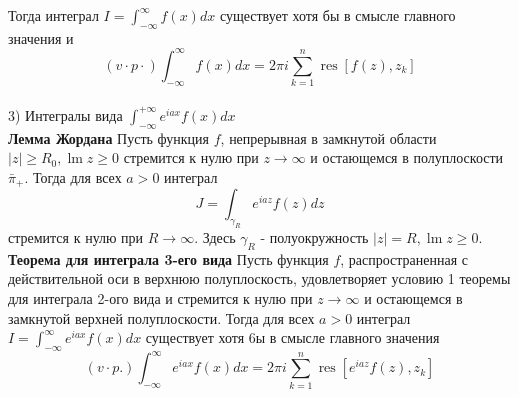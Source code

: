 \documentclass{article}
\begin{document}
	Тогда интеграл $ I=\int_{-\infty}^{\infty} f(x) d x $ существует хотя бы в смысле главного значения и
	\begin{equation}
	(v \cdot p \cdot) \int_{-\infty}^{\infty} f(x) d x=2 \pi i \sum_{k=1}^{n} \operatorname{res}\left[f(z), z_{k}\right]
	\end{equation}
	\\
	3) Интегралы вида $\int_{-\infty}^{+\infty} {e}^{iax}f(x)dx$\\
	\textbf{Лемма Жордана} Пусть функция $ f$, непрерывная в замкнутой области $ |z| \geqslant R_{0}, \operatorname{lm} z \geqslant 0$ стремится к нулю при $ z \rightarrow \infty $ и остающемся в полуплоскости $ \bar{\pi}_{+} $. Тогда для всех $ a>0 $ интеграл
	\begin{equation}
	J=\int_{\gamma_{R}} e^{i a z} f(z) d z
	\end{equation}
	стремится к нулю при $ R \rightarrow \infty $. Здесь $ \gamma_{R}$ - полуокружность $ |z|=R, \operatorname{lm} z \geqslant 0$.\\
	\textbf{Теорема для интеграла 3-его вида} Пусть функция $ f $, распространенная с действительной оси в верхнюю полуплоскость, удовлетворяет условию 1 теоремы для интеграла 2-ого вида и стремится к нулю при $ z \rightarrow \infty $ и остающемся в замкнутой верхней полуплоскости. Тогда для всех $ a>0 $ интеграл $I=\int_{-\infty}^{\infty} e^{i a x} f(x) d x $ существует хотя 6ы в смысле главного значения
	\begin{equation}
	(v \cdot p .) \int_{-\infty}^{\infty} e^{i a x} f(x) d x=2 \pi i \sum_{k=1}^{n} \operatorname{res}\left[e^{i a z} f(z), z_{k}\right]
	\end{equation}
\end{document}
